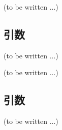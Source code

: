 \clearpage
(to be written ...)


\subsection{引数\TBW}
(to be written ...)



\clearpage
(to be written ...)


\subsection{引数\TBW}
(to be written ...)
